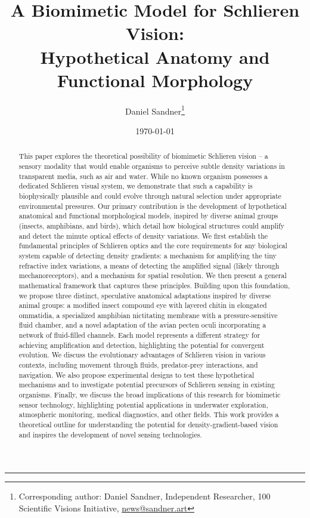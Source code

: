 \documentclass[11pt]{article}
\title{A Biomimetic Model for Schlieren Vision:\\Hypothetical Anatomy and Functional Morphology}
\author{{Daniel Sandner}\thanks{Corresponding author: Daniel Sandner, Independent Researcher, 100 Scientific Visions Initiative, \href{news@sandner.art}{news@sandner.art}}} %
\date{\today} %
\begin{document}
\maketitle

\bigskip\noindent\rule{\linewidth}{0.4pt}\bigskip

\begin{abstract}
This paper explores the theoretical possibility of biomimetic Schlieren vision – a sensory modality that would enable organisms to perceive subtle density variations in transparent media, such as air and water. While no known organism possesses a dedicated Schlieren visual system, we demonstrate that such a capability is biophysically plausible and could evolve through natural selection under appropriate environmental pressures. Our primary contribution is the development of hypothetical anatomical and functional morphological models, inspired by diverse animal groups (insects, amphibians, and birds), which detail how biological structures could amplify and detect the minute optical effects of density variations. We first establish the fundamental principles of Schlieren optics and the core requirements for any biological system capable of detecting density gradients: a mechanism for amplifying the tiny refractive index variations, a means of detecting the amplified signal (likely through mechanoreceptors), and a mechanism for spatial resolution. We then present a general mathematical framework that captures these principles. Building upon this foundation, we propose three distinct, speculative anatomical adaptations inspired by diverse animal groups: a modified insect compound eye with layered chitin in elongated ommatidia, a specialized amphibian nictitating membrane with a pressure-sensitive fluid chamber, and a novel adaptation of the avian pecten oculi incorporating a network of fluid-filled channels. Each model represents a different strategy for achieving amplification and detection, highlighting the potential for convergent evolution. We discuss the evolutionary advantages of Schlieren vision in various contexts, including movement through fluids, predator-prey interactions, and navigation. We also propose experimental designs to test these hypothetical mechanisms and to investigate potential precursors of Schlieren sensing in existing organisms. Finally, we discuss the broad implications of this research for biomimetic sensor technology, highlighting potential applications in underwater exploration, atmospheric monitoring, medical diagnostics, and other fields. This work provides a theoretical outline for understanding the potential for density-gradient-based vision and inspires the development of novel sensing technologies.
\end{abstract}
\end{document}
